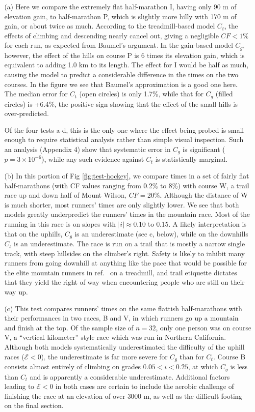 \documentclass[10pt,letterpaper]{article}
\begin{document}
(a) Here we compare the extremely flat half-marathon I, having only 90 m of elevation gain,
to half-marathon P, which is slightly more hilly with 170 m of gain, or about twice as much.
According to the treadmill-based model $C_t$, the effects of climbing and descending
nearly cancel out, giving a negligible $CF<1\%$ for each run, as expected from Baumel's argument.
In the gain-based model $C_g$, however, the effect of the hills on course P is
6 times its elevation gain, which is equivalent to adding 1.0 km to its length. The effect for I would
be half as much, causing the model to predict a considerable difference in the times on
the two courses. In the figure we see that Baumel's approximation is a good one here. The median
error for $C_t$ (open circles) is only 1.7\%, while that for $C_g$ (filled circles) is +6.4\%,
the positive sign showing that the effect of the small hills is over-predicted.

Of the four tests a-d, this is the only one where the effect being probed is small enough to
require statistical analysis rather than simple visual inspection.
Such an analysis (Appendix 4)
show that systematic error in $C_g$ is significant ($p=3\times10^{-6}$), while any such evidence against
$C_t$ is statistically marginal.

(b) In this portion of Fig \ref{fig:test-hockey}, we compare times in a set of fairly flat half-marathons
(with CF values ranging from 0.2\% to 8\%) with course W, a trail race up and down half of Mount Wilson, $CF=20\%$.
Although the distance of W is much shorter, most runners' times are only slightly lower. We see that both
models greatly underpredict the runners' times in the mountain race. Most of the running in this race is
on slopes with $|i|\approx 0.10$ to 0.15. A likely interpretation is that on the uphills, $C_g$ is an
underestimate (see c, below), while on the downhills $C_t$ is an underestimate. The race is run on a trail that is
mostly a narrow single track, with steep hillsides on the climber's right. Safety is likely to inhibit
many runners from going downhill at anything like the pace that would be possible for the   elite mountain runners in ref.~\cite{minetti}
on a treadmill, and trail etiquette dictates that they yield the right of way when encountering
people who are still on their way up.

(c) This test compares runners' times on the same flattish half-marathons with their performances in
two races, B and V, in which runners go up a mountain and finish at the top. Of the sample size of $n=32$, only
one person was on course V, a ``vertical kilometer''-style race which was run in Northern California.
Although both models systematically underestimated the difficulty of the uphill races ($\mathcal{E}<0$),
the underestimate is far more severe for $C_g$ than for $C_t$. Course B consists almost
entirely of climbing on grades $0.05<i<0.25$, at which $C_g$ is less than $C_t$ and is apparently a
considerable underestimate. Additional factors leading to $\mathcal{E}<0$ in both cases
are certain to include the aerobic challenge of finishing the race at an elevation of over 3000 m,
as well as the difficult footing on the final section.
\end{document}
